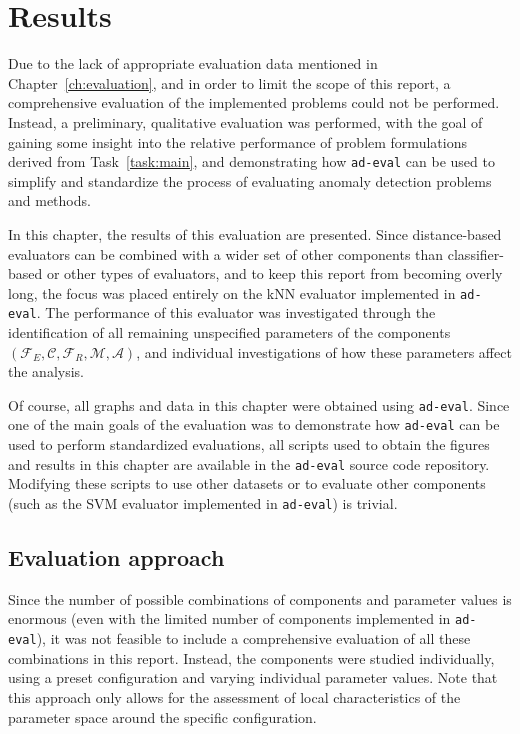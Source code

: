 \chapter{Results}
\label{ch:results}

Due to the lack of appropriate evaluation data mentioned in Chapter~\ref{ch:evaluation}, and in order to limit the scope of this report, a comprehensive evaluation of the implemented problems could not be performed. Instead, a preliminary, qualitative evaluation was performed, with the goal of gaining some insight into the relative performance of problem formulations derived from Task~\ref{task:main}, and demonstrating how \texttt{ad-eval} can be used to simplify and standardize the process of evaluating anomaly detection problems and methods. 

In this chapter, the results of this evaluation are presented. Since distance-based evaluators can be combined with a wider set of other components than classifier-based or other types of evaluators, and to keep this report from becoming overly long, the focus was placed entirely on the kNN evaluator implemented in \texttt{ad-eval}. The performance of this evaluator was investigated through the identification of all remaining unspecified parameters of the components $(\mathcal{F}_E, \mathcal{C}, \mathcal{F}_R, \mathcal{M},\mathcal{A})$, and individual investigations of how these parameters affect the analysis.

Of course, all graphs and data in this chapter were obtained using \texttt{ad-eval}. Since one of the main goals of the evaluation was to demonstrate how \texttt{ad-eval} can be used to perform standardized evaluations, all scripts used to obtain the figures and results in this chapter are available in the \texttt{ad-eval} source code repository. Modifying these scripts to use other datasets or to evaluate other components (such as the SVM evaluator implemented in \texttt{ad-eval}) is trivial.

\section{Evaluation approach}

Since the number of possible combinations of components and parameter values is enormous (even with the limited number of components implemented in \texttt{ad-eval}), it was not feasible to include a comprehensive evaluation of all these combinations in this report. Instead, the components were studied individually, using a preset configuration and varying individual parameter values. Note that this approach only allows for the assessment of local characteristics of the parameter space around the specific configuration.

